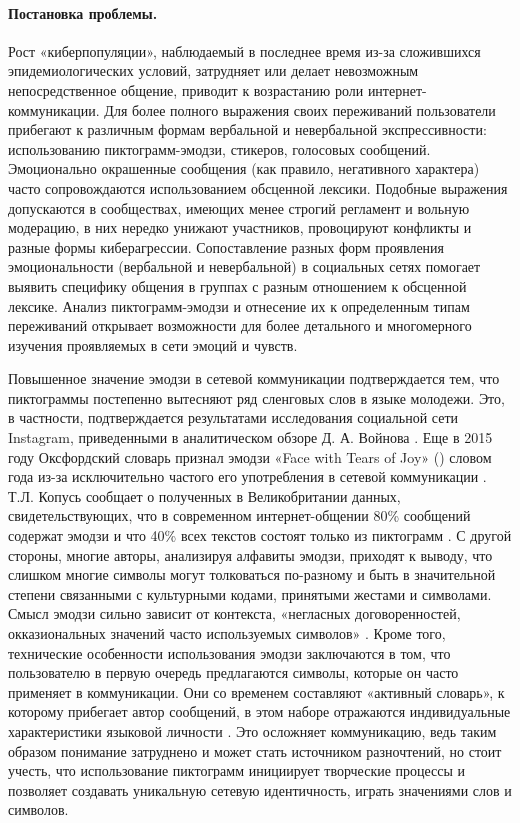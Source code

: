 \paragraph{Постановка проблемы.}

Рост «киберпопуляции», наблюдаемый в последнее время из-за сложившихся эпидемиологических условий, затрудняет или делает невозможным непосредственное общение, приводит к возрастанию роли интернет-коммуникации. Для более полного выражения своих переживаний пользователи прибегают к различным формам вербальной и невербальной экспрессивности: использованию пиктограмм-эмодзи, стикеров, голосовых сообщений. Эмоционально окрашенные сообщения (как правило, негативного характера) часто сопровождаются использованием обсценной лексики. Подобные выражения допускаются в сообществах, имеющих менее строгий регламент и вольную модерацию, в них нередко унижают участников, провоцируют конфликты и разные формы киберагрессии. Сопоставление разных форм проявления эмоциональности (вербальной и невербальной) в социальных сетях помогает выявить специфику общения в группах с разным отношением к обсценной лексике. Анализ пиктограмм-эмодзи и отнесение их к определенным типам переживаний открывает возможности для более детального и многомерного изучения проявляемых в сети эмоций и чувств.

Повышенное значение эмодзи в сетевой коммуникации подтверждается тем, что пиктограммы постепенно вытесняют ряд сленговых слов в языке молодежи. Это, в частности, подтверждается результатами исследования социальной сети Instagram, приведенными в аналитическом обзоре Д. А. Войнова \cite{Voinov}. Еще в 2015 году Оксфордский словарь признал эмодзи «Face with Tears of Joy» (\facewithtearsofjoy) словом года из-за исключительно частого его употребления в сетевой коммуникации \cite{WordOfTheYear2015}. Т.Л. Копусь сообщает о полученных в Великобритании данных, свидетельствующих, что в современном интернет-общении 80\% сообщений содержат эмодзи и что 40\% всех текстов состоят только из пиктограмм \cite{Kopus}. С другой стороны, многие авторы, анализируя алфавиты эмодзи, приходят к выводу, что слишком многие символы могут толковаться по-разному и быть в значительной степени связанными с культурными кодами, принятыми жестами и символами. Смысл эмодзи сильно зависит от контекста, «негласных договоренностей, окказиональных значений часто используемых символов» \cite{Krylov}. Кроме того, технические особенности использования эмодзи заключаются в том, что пользователю в первую очередь предлагаются символы, которые он часто применяет в коммуникации. Они со временем составляют «активный словарь», к которому прибегает автор сообщений, в этом наборе отражаются индивидуальные характеристики языковой личности \cite{Krylov}. Это осложняет коммуникацию, ведь таким образом понимание затруднено и может стать источником разночтений, но стоит учесть, что использование пиктограмм инициирует творческие процессы и позволяет создавать уникальную сетевую идентичность, играть значениями слов и символов.

